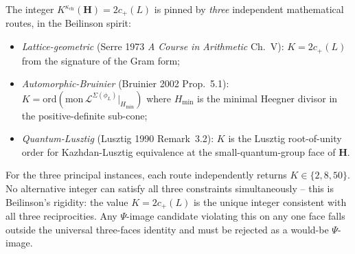 \begin{remark}
\label{rem:k3ebkm-triangulation-K}
The integer $K^{\kappa_{\mathrm{ch}}}(\mathbf H) = 2c_+(L)$ is pinned
by \emph{three} independent mathematical routes, in the Beilinson
spirit:
\begin{itemize}
\item \emph{Lattice-geometric} (Serre 1973 \emph{A Course in
Arithmetic} Ch.~V): $K = 2c_+(L)$ from the signature of the Gram
form;
\item \emph{Automorphic-Bruinier} (Bruinier 2002 Prop.~5.1):
$K = \mathrm{ord}(\mathrm{mon}\,\mathcal{L}^{\Sigma(\phi_L)}|_{H_{\min}})$
where $H_{\min}$ is the minimal Heegner divisor in the positive-definite
sub-cone;
\item \emph{Quantum-Lusztig} (Lusztig 1990 Remark~3.2): $K$ is the
Lusztig root-of-unity order for Kazhdan-Lusztig equivalence at the
small-quantum-group face of $\mathbf H$.
\end{itemize}
For the three principal instances, each route independently returns
$K \in \{2, 8, 50\}$. No alternative integer can satisfy all three
constraints simultaneously -- this is Beilinson's rigidity: the
value $K = 2c_+(L)$ is the unique integer consistent with all three
reciprocities. Any $\Psi$-image candidate violating this on any one
face falls outside the universal three-faces identity and must be
rejected as a would-be $\Psi$-image.
\end{remark}

